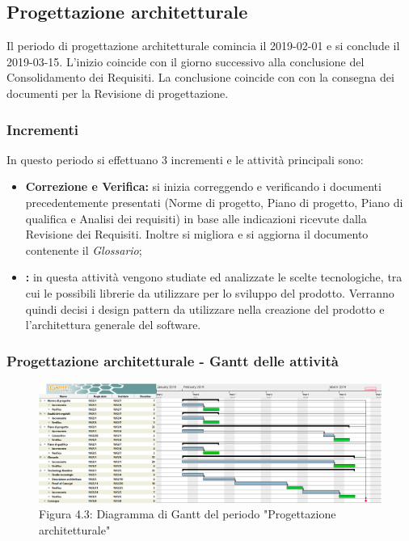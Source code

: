 \subsection{Progettazione architetturale}
Il periodo di progettazione architetturale comincia il 2019-02-01 e si conclude il 2019-03-15. L'inizio coincide con il giorno successivo alla conclusione del Consolidamento dei Requisiti. La conclusione coincide con con la consegna dei documenti per la Revisione di progettazione. \\
\subsubsection{Incrementi}
In questo periodo si effettuano 3 incrementi e le attività principali sono:
\begin{itemize}
	\item \textbf{Correzione e Verifica:} si inizia correggendo e verificando i documenti precedentemente presentati (Norme di progetto, Piano di progetto, Piano di qualifica e Analisi dei requisiti) in base alle indicazioni ricevute dalla Revisione dei Requisiti. Inoltre si migliora e si aggiorna il documento contenente il \textit{Glossario};
	\item \textbf{:} in questa attività vengono studiate ed analizzate le scelte tecnologiche, tra cui le possibili librerie da utilizzare per lo sviluppo del prodotto. Verranno quindi decisi i design pattern da utilizzare nella creazione del prodotto e l'architettura generale del software.
\end{itemize}

\subsubsection{Progettazione architetturale - Gantt delle attività}

\begin{figure} [H]
	\centering
	\includegraphics[scale=0.3]{Res/Gantt/Progettazione}
	\caption{Figura 4.3: Diagramma di Gantt del periodo "Progettazione architetturale"}\label{}
\end{figure}

\pagebreak

